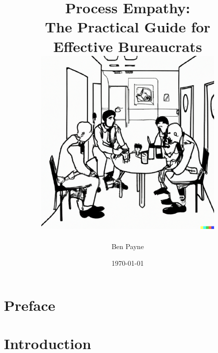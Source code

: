 \documentclass[openright]{book} %
\title{\huge{Process Empathy:\\
The Practical Guide for\\ Effective Bureaucrats}\\
\vfill
\includegraphics[width=0.7\textwidth]{images/bureaucrat_empathizing_with_coworkers_in_office_breakroom.pdf}
}
\author{\huge Ben Payne}
\date{\today}
\begin{document}





\begin{titlepage}
\iftoggle{printedonpaper}{}{\maketitle}
\thispagestyle{empty}
\end{titlepage}
\clearpage





\frontmatter %

\clearpage

\iftoggle{showminitoc}{\dominitoc}{} %
\hypertarget{contents}{}
\tableofcontents\label{sec:toc}

\chapter{Preface}

\mainmatter %


\chapter{Introduction\label{sec:introduction}}
\iftoggle{showbacktotoc}{{\footnotesize Back to the \hyperref[sec:toc]{Main Table of Contents}}}{}
\end{document}
